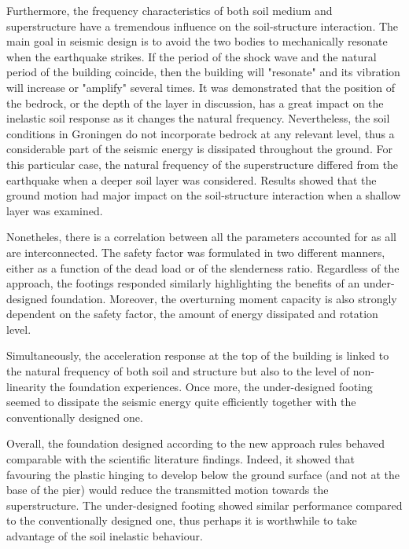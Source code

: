  Furthermore, the frequency characteristics of both soil medium and superstructure have a tremendous influence on the soil-structure interaction. The main goal in seismic design is to avoid the two bodies to mechanically resonate when the earthquake strikes. If the period of the shock wave and the natural period of the building coincide, then the building will "resonate" and its vibration will increase or "amplify" several times. It was demonstrated that the position of the bedrock, or the depth of the layer in discussion, has a great impact on the inelastic soil response as it changes the natural frequency. Nevertheless, the soil conditions in Groningen do not incorporate bedrock at any relevant level, thus a considerable part of the seismic energy is dissipated throughout the ground. For this particular case, the natural frequency of the superstructure differed from the earthquake when a deeper soil layer was considered. Results showed that the ground motion had major impact on the soil-structure interaction when a shallow layer was examined. 
 
 Nonetheles, there is a correlation between all the parameters accounted for as all are interconnected. The safety factor was formulated in two different manners, either as a function of the dead load or of the slenderness ratio. Regardless of the approach, the footings responded similarly highlighting the benefits of an under-designed foundation. Moreover, the overturning moment capacity is also strongly dependent on the safety factor, the amount of energy dissipated and rotation level. 
 
 
 Simultaneously, the acceleration response at the top of the building is linked to the natural frequency of both soil and structure but also to the level of non-linearity the foundation experiences. Once more, the under-designed footing seemed to dissipate the seismic energy quite efficiently together with the conventionally designed one. 
 
 Overall, the foundation designed according to the new approach rules behaved comparable with the scientific literature findings. Indeed, it showed that favouring the plastic hinging to develop below the ground surface (and not at the base of the pier) would reduce the transmitted motion towards the superstructure. The under-designed footing showed similar performance compared to the conventionally designed one, thus perhaps it is worthwhile to take advantage of the soil inelastic behaviour. 
 
